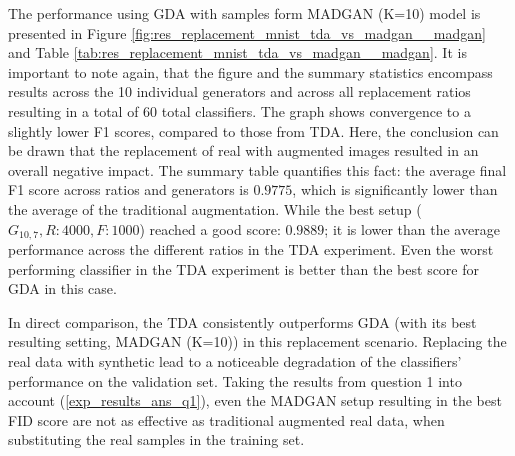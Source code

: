 The performance using GDA with samples form MADGAN (K=10) model is presented in Figure \ref{fig:res_replacement_mnist_tda_vs_madgan__madgan} and Table \ref{tab:res_replacement_mnist_tda_vs_madgan__madgan}. It is important to note again, that the figure and the summary statistics encompass results across the 10 individual generators and across all replacement ratios resulting in a total of $60$ total classifiers. The graph shows convergence to a slightly lower F1 scores, compared to those from TDA. Here, the conclusion can be drawn that the replacement of real with augmented images resulted in an overall negative impact. The summary table quantifies this fact: the average final F1 score across ratios and generators is $0.9775$, which is significantly lower than the average of the traditional augmentation. While the best setup (\(G_{10,7}, R:4000, F:1000\)) reached a good score: $0.9889$; it is lower than the average performance across the different ratios in the TDA experiment. Even the worst performing classifier in the TDA experiment is better than the best score for GDA in this case.

In direct comparison, the TDA consistently outperforms GDA (with its best resulting setting, MADGAN (K=10)) in this replacement scenario. Replacing the real data with synthetic lead to a noticeable degradation of the classifiers' performance on the validation set. Taking the results from question 1 into account (\ref{exp_results_ans_q1}), even the MADGAN setup resulting in the best FID score are not as effective as traditional augmented real data, when substituting the real samples in the training set.

